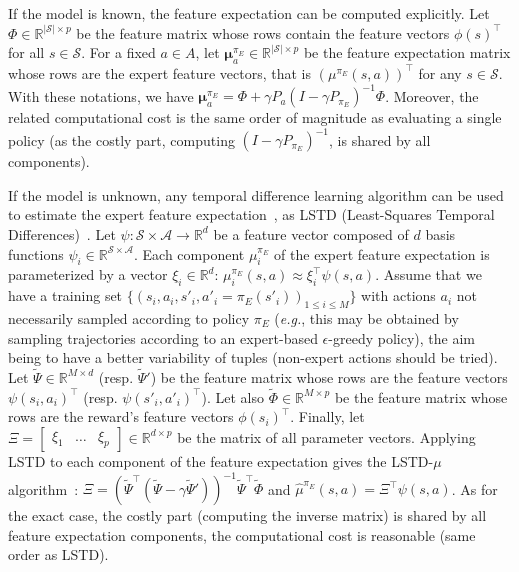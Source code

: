 \documentclass[english,utf8]{./hermes-journal}
\newcommand{\s}{\mathcal{S}}
\newcommand{\A}{\mathcal{A}}
\newcommand{\Mu}{\boldsymbol{\mu}}
\begin{document}
If the model is known, the feature expectation can be computed
explicitly. Let $\Phi\in\mathbb{R}^{|\s|\times p}$ be the feature
matrix whose rows contain the feature vectors $\phi(s)^\top$ for all
$s\in\s$.
%
%
For a fixed $a\in A$, let $\Mu^{\pi_E}_a \in\mathbb{R}^{|\s|\times
p}$ be the feature expectation matrix whose rows are the expert
feature vectors, that is $(\mu^{\pi_E}(s,a))^\top$ for any $s\in\s$.
With these notations, we have $\Mu_a^{\pi_E} = \Phi + \gamma
P_a(I-\gamma P_{\pi_E})^{-1} \Phi$.
Moreover, the related computational cost is the same order of
magnitude as evaluating a single policy (as the costly part,
computing $(I-\gamma P_{\pi_E})^{-1}$, is shared by all components).

If the model is unknown, any temporal difference learning algorithm
can be used to estimate the expert feature
expectation~\cite{Klein:2011}, as LSTD (Least-Squares Temporal
Differences)~\cite{Bradtke:1996}. Let $\psi:\s\times \A \rightarrow
\mathbb{R}^d$ be a feature vector composed of $d$ basis functions
$\psi_i \in\mathbb{R}^{\s\times \A}$. Each component $\mu_i^{\pi_E}$
of the expert feature expectation is parameterized by a vector
$\xi_i\in\mathbb{R}^d$: $\mu_i^{\pi_E}(s,a)\approx \xi_i^\top
\psi(s,a)$. Assume that we have a training set
$\{(s_i,a_i,s'_i,a'_i=\pi_E(s'_i))_{1\leq i \leq M}\}$ with actions
$a_i$ not necessarily sampled according to policy $\pi_E$
(\textit{e.g.}, this may be obtained by sampling trajectories
according to an expert-based $\epsilon$-greedy policy), the aim
being to have a better variability of tuples (non-expert actions
should be tried). Let $\tilde{\Psi}\in \mathbb{R}^{M\times d}$
(resp. $\tilde{\Psi}'$) be the feature matrix whose rows are the
feature vectors $\psi(s_i,a_i)^\top$ (resp. $\psi(s'_i,a'_i)^\top$).
Let also $\tilde{\Phi}\in \mathbb{R}^{M\times p}$ be the feature
matrix whose rows are the reward's feature vectors $\phi(s_i)^\top$.
Finally, let $\Xi =
\begin{bmatrix}   \xi_1 & \dots & \xi_p
\end{bmatrix}\in\mathbb{R}^{d\times p}$ be the matrix of all
parameter vectors. Applying LSTD to each component of the feature
expectation gives the LSTD-$\mu$ algorithm~\cite{Klein:2011}: $\Xi =
(\tilde{\Psi}^\top(\tilde{\Psi} - \gamma
\tilde{\Psi}'))^{-1}\tilde{\Psi}^\top \tilde{\Phi}$ and
$\hat{\mu}^{\pi_E}(s,a) = \Xi^\top \psi(s,a)$.
As for the exact case, the costly part (computing the inverse
matrix) is shared by all feature expectation components, the
computational cost is reasonable (same order as LSTD).
\end{document}

